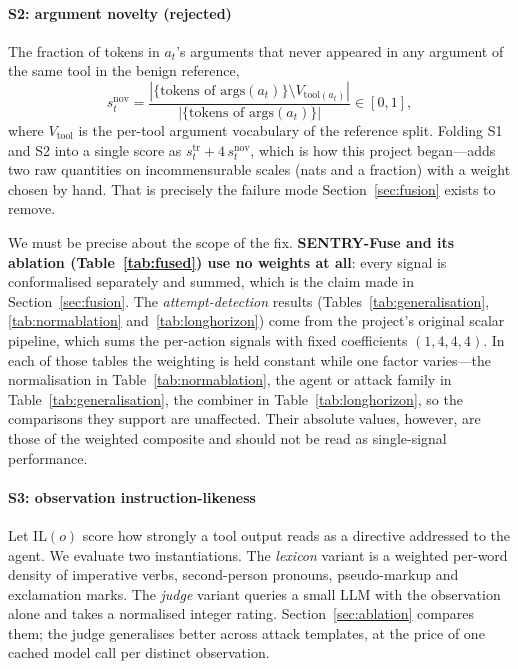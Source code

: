 \documentclass[pdflatex,sn-basic]{sn-jnl}%
\theoremstyle{thmstyleone}
\theoremstyle{thmstyletwo}
\theoremstyle{thmstylethree}
\begin{document}
\paragraph{S2: argument novelty (rejected)}
The fraction of tokens in $a_t$'s arguments that never appeared in any argument of
the same tool in the benign reference,
\begin{equation}
s^{\mathrm{nov}}_t = \frac{|\{\text{tokens of } \mathrm{args}(a_t)\} \setminus
V_{\mathrm{tool}(a_t)}|}{|\{\text{tokens of } \mathrm{args}(a_t)\}|} \in [0,1],
\end{equation}
where $V_{\mathrm{tool}}$ is the per-tool argument vocabulary of the reference
split. Folding S1 and S2 into a single score as
$s^{\mathrm{tr}}_t + 4\,s^{\mathrm{nov}}_t$, which is how this project began---adds
two raw quantities on incommensurable scales (nats and a fraction) with a weight
chosen by hand. That
is precisely the failure mode Section~\ref{sec:fusion} exists to remove.

We must be precise about the scope of the fix.
\textbf{SENTRY-Fuse and its ablation (Table~\ref{tab:fused}) use no weights at
all}: every signal is conformalised separately and summed, which is the claim made
in Section~\ref{sec:fusion}. The \emph{attempt-detection} results
(Tables~\ref{tab:generalisation}, \ref{tab:normablation}
and~\ref{tab:longhorizon}) come from the project's original scalar pipeline, which
sums the per-action signals with fixed coefficients $(1, 4, 4, 4)$. In each of
those tables the weighting is held constant while one factor varies---the
normalisation in Table~\ref{tab:normablation}, the agent or attack family in
Table~\ref{tab:generalisation}, the combiner in
Table~\ref{tab:longhorizon}, so the comparisons they support are unaffected.
Their absolute values, however, are those of the weighted composite and should not
be read as single-signal performance.

\paragraph{S3: observation instruction-likeness}
Let $\mathrm{IL}(o)$ score how strongly a tool output reads as a directive
addressed to the agent. We evaluate two instantiations. The \emph{lexicon}
variant is a weighted per-word density of imperative verbs, second-person
pronouns, pseudo-markup and exclamation marks. The \emph{judge} variant queries a
small LLM with the observation alone and takes a normalised integer rating.
Section~\ref{sec:ablation} compares them; the judge generalises better across
attack templates, at the price of one cached model call per distinct observation.
\end{document}
